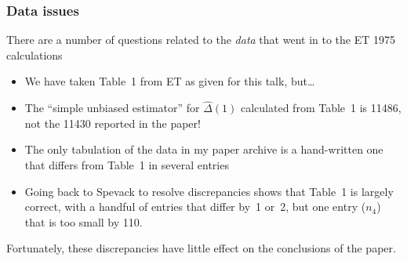 \begin{frame}
	\frametitle{Data issues}
	
	There are a number of questions related to the \textit{data} that went in to the ET 1975 calculations
	
	\begin{itemize}
		\item We have taken Table~1 from ET as given for this talk, but\dots
		\item The ``simple unbiased estimator'' for $\hat\Delta(1)$ calculated from Table~1 is 11486, not the 11430 reported in the paper!
		\item The only tabulation of the data in my paper archive is a hand-written one that differs from Table~1 in several entries
		\item Going back to Spevack to resolve discrepancies shows that Table~1 is largely correct, with a handful of entries that differ by~1 or~2, but one entry ($n_4$) that is too small by 110.
	\end{itemize}
	
	Fortunately, these discrepancies have little effect on the conclusions of the paper.
\end{frame}